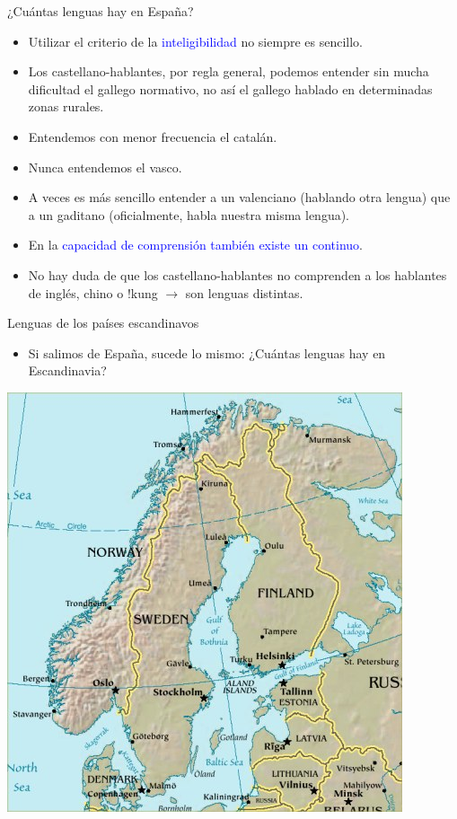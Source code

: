 \documentclass[handout]{beamer}
\begin{document}
\begin{frame}{¿Cuántas lenguas hay en España?}
\begin{itemize}
	\item Utilizar el criterio de la \textcolor{blue}{inteligibilidad} no siempre es sencillo.
	\item Los castellano-hablantes, por regla general, podemos entender sin mucha dificultad el gallego normativo, no así el gallego hablado en determinadas zonas rurales.
	\item Entendemos con menor frecuencia el catalán. 
	\item Nunca entendemos el vasco.
	\item A veces es más sencillo entender a un valenciano (hablando otra lengua) que a un gaditano (oficialmente, habla nuestra misma lengua).
	\item En la \textcolor{blue}{capacidad de comprensión también existe un continuo}.
	\item No hay duda de que los castellano-hablantes no comprenden a los hablantes de inglés, chino o !kung $\rightarrow$ son lenguas distintas.
\end{itemize}
\end{frame}

\begin{frame}{Lenguas de los países escandinavos}
\begin{itemize}
	\item Si salimos de España, sucede lo mismo: ¿Cuántas lenguas hay en Escandinavia? 
\end{itemize}
	\begin{center} 
	  \includegraphics[scale=1]{img/scandinavia.jpg} 
	\end{center}
\end{frame}
\end{document}

